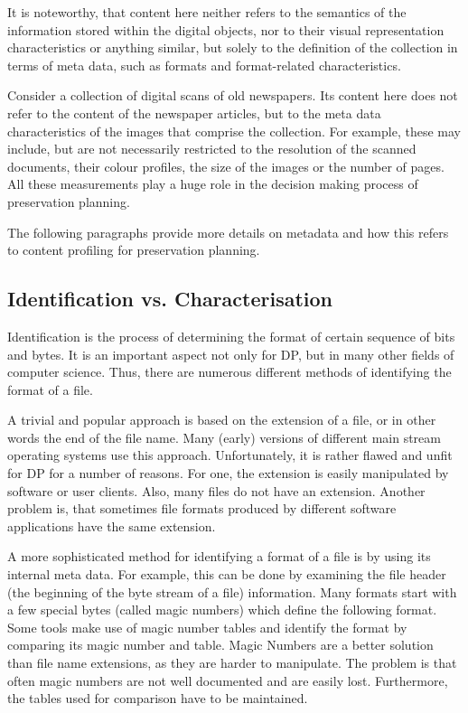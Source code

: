 It is noteworthy, that content here neither refers to the semantics of the information stored within the digital objects, nor to their visual representation characteristics or anything similar, but solely to the definition of the collection in terms of meta data, such as formats and format-related characteristics.

Consider a collection of digital scans of old newspapers. Its content here does not refer to the content of the newspaper articles, but to the meta data characteristics of the images that comprise the collection. For example, these may include, but are not necessarily restricted to the resolution of the scanned documents, their colour profiles, the size of the images or the number of pages. All these measurements play a huge role in the decision making process of preservation planning.

The following paragraphs provide more details on metadata and how this refers to content profiling for preservation planning.

\subsection{Identification vs. Characterisation}
Identification is the process of determining the format of certain sequence of bits and bytes. It is an important aspect not only for DP, but in many other fields of computer science. Thus, there are numerous different methods of identifying the format of a file.

A trivial and popular approach is based on the extension of a file, or in other words the end of the file name. Many (early) versions of different main stream operating systems use this approach. Unfortunately, it is rather flawed and unfit for DP for a number of reasons. For one, the extension is easily manipulated by software or user clients. Also, many files do not have an extension. Another problem is, that sometimes file formats produced by different software applications have the same extension.

A more sophisticated method for identifying a format of a file is by using its internal meta data. For example, this can be done by examining the file header (the beginning of the byte stream of a file) information. Many formats start with a few special bytes (called magic numbers) which define the following format. Some tools make use of magic number tables and identify the format by comparing its magic number and table. Magic Numbers are a better solution than file name extensions, as they are harder to manipulate. The problem is that often magic numbers are not well documented and are easily lost. Furthermore, the tables used for comparison have to be maintained.

